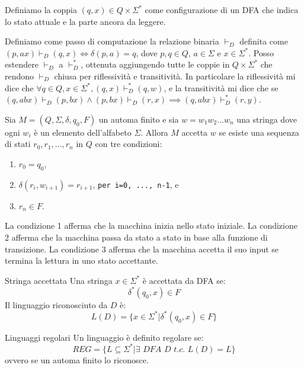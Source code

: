 Definiamo la coppia $(q, x)\in Q\times\Sigma^*$ come configurazione di un DFA che indica lo stato attuale e la parte ancora da leggere. 

Definiamo come passo di computazione la relazione binaria $\vdash_D$ definita come $(p, ax) \vdash_D (q, x) \iff \delta(p, a) = q$, dove $p, q\in Q$, $a\in\Sigma$ e $x\in\Sigma^*$. Posso estendere $\vdash_D$ a $\vdash_D^*$, ottenuta aggiungendo tutte le coppie in $Q\times\Sigma^*$ che rendono $\vdash_D$ chiusa per riflessività e transitività. In particolare la riflessività mi dice che $\forall q\in Q, x\in\Sigma^*, (q, x) \vdash_D^*(q, w)$, e la transitività mi dice che se $(q, abx) \vdash_D (p, bx) \land (p, bx) \vdash_D (r, x) \implies (q, abx) \vdash^*_D (r, y)$.

Sia $M = (Q, \Sigma, \delta, q_0, F)$ un automa finito e sia $w=w_1w_2...w_n$ una stringa dove ogni $w_i$ è un elemento dell'alfabeto $\Sigma$. Allora $M$ accetta $w$ se esiste una sequenza di stati $r_0, r_1,...,r_n$ in $Q$ con tre condizioni:
\begin{enumerate}
    \item $r_0=q_0$,
    \item $\delta(r_i ,w_{i + 1})=r_{i+1}$, \texttt{per i=0, ..., n-1}, e
    \item $r_n\in F$.
\end{enumerate}

La condizione 1 afferma che la macchina inizia nello stato iniziale. La condizione 2 afferma che la macchina passa da stato a stato in base alla funzione di transizione. La condizione 3 afferma che la macchina accetta il suo input se termina la lettura in uno stato accettante.


\begin{Definition}{Stringa accettata}{}
    Una stringa $x\in\Sigma^*$ è accettata da DFA se:
    \begin{equation*}
        \delta^*(q_0, x)\in F
    \end{equation*}
    Il linguaggio riconosciuto da $D$ è:
    \begin{equation*}
        L(D)=\{x\in\Sigma^*|\delta^*(q_0, x)\in F\}
    \end{equation*}
\end{Definition}

\begin{Definition}{Linguaggi regolari}{}
    Un linguaggio è definito regolare se:
    \begin{equation*}
        REG=\{L\subseteq\Sigma^*|\exists \textit{ DFA } D \textit{ t.c. } L(D)=L\}
    \end{equation*}
    ovvero se un automa finito lo riconosce.
\end{Definition}

